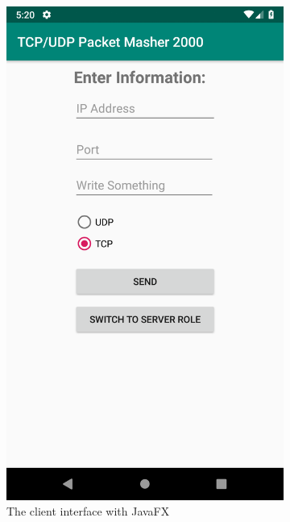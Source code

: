 \begin{figure}[H]
	\centering
	\begin{subfigure}{.49\textwidth}
		\centering
		\includegraphics[width=0.9\linewidth]{images/task1/clientAndroid.png}
		\caption{The client interface with JavaFX}
		\label{fig:clientAndroid}
	\end{subfigure}%
	\begin{subfigure}{.49\textwidth}
		\centering

\end{subfigure}
\end{figure}
